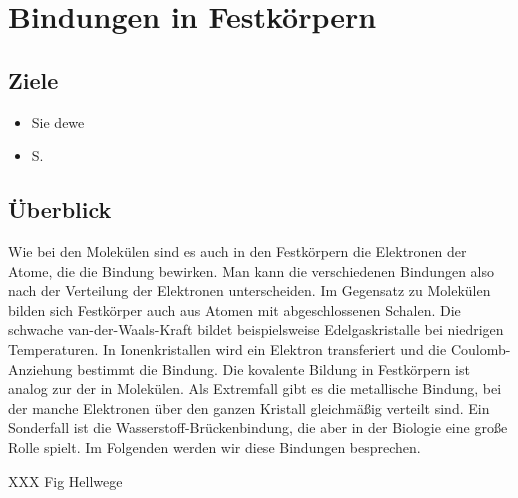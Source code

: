 
\chapter{Bindungen in Festkörpern}





\section{Ziele}

\begin{itemize}
\item Sie dewe

\item S.

\end{itemize}





\section{Überblick}



Wie bei den Molekülen  sind es auch in den Festkörpern die Elektronen der Atome, die die Bindung bewirken. Man kann die verschiedenen Bindungen also nach der Verteilung der Elektronen unterscheiden. Im Gegensatz zu Molekülen bilden sich Festkörper auch aus Atomen mit abgeschlossenen Schalen. Die schwache van-der-Waals-Kraft bildet beispielsweise Edelgaskristalle bei niedrigen Temperaturen. In Ionenkristallen wird ein Elektron transferiert und die Coulomb-Anziehung  bestimmt die Bindung. Die kovalente Bildung in Festkörpern ist analog zur der in Molekülen. Als Extremfall gibt es die metallische Bindung, bei der manche Elektronen über den ganzen Kristall gleichmäßig verteilt sind. Ein Sonderfall ist die Wasserstoff-Brückenbindung, die aber in der Biologie eine große Rolle spielt. Im Folgenden werden wir diese Bindungen besprechen.

XXX Fig Hellwege


